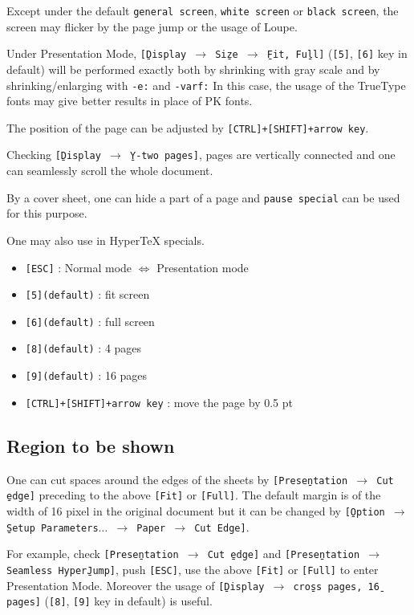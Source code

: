 \documentclass{article}
\begin{document}
Except under the default {\tt general screen}, {\tt white screen} or 
{\tt black screen}, the screen may flicker by the page jump or the usage of 
Loupe.

Under Presentation Mode, {\tt [\b{D}isplay $\to$ Si\b{z}e $\to$ \b{F}it, 
Fu\b{l}l]} ({\tt[5]}, {\tt[6]} key in default) 
will be performed exactly both by shrinking with gray scale and by 
shrinking/enlarging with {\tt -e:} and {\tt -varf:}  In this case, 
the usage of the TrueType fonts may give better results in place of PK fonts.
\medskip

The position of the page can be adjusted by {\tt[CTRL]+[SHIFT]+arrow key}.

Checking {\tt[\b{D}isplay $\to$ \b{Y}-two pages]}, pages are vertically connected
and one can seamlessly scroll the whole document.

By a cover sheet, one can hide a part of a page and {\tt pause special} can 
be used for this purpose.

One may also use  in {Hyper\TeX} 
specials.
\begin{itemize}
\item
{\tt [ESC]} : Normal mode $\Leftrightarrow$ Presentation mode
\item
{\tt [5](default)} : fit screen
\item
{\tt [6](default)} : full screen
\item
{\tt [8](default)} : 4 pages
\item
{\tt [9](default)} : 16 pages
\item
{\tt [CTRL]+[SHIFT]+arrow key} : move the page by 0.5 pt
\end{itemize}
\subsection{Region to be shown}
One can cut spaces around the edges of the sheets by 
{\tt [Prese\b{n}tation $\to$ Cut \b{e}dge]} preceding to the above 
{\tt[Fit]} or {\tt[Full]}.  The default margin is of the width of 
16 pixel in the original document but it can be changed by 
{\tt[\b{O}ption $\to$ \b{S}etup Parameters$\ldots$ $\to$ 
Paper $\to$ Cut Edge]}.
\medskip

For example, check {\tt [Prese\b{n}tation $\to$ Cut \b{e}dge]} and 
{\tt [Prese\b{n}tation $\to$ Seamless Hyper\b{J}ump]}, push {\tt[ESC]}, 
use the above {\tt[Fit]} or {\tt[Full]} to enter Presentation Mode. 
Moreover the usage of {\tt [\b{D}isplay $\to$ cro\b{s}s pages, 1\b{6} pages]}
 ({\tt[8]}, {\tt[9]} key in default) is useful.
\medskip
\end{document}
